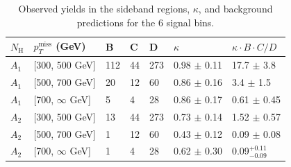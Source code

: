 \begin{table}[hbp!]
\centering
\caption{
Observed yields in the sideband regions, $\kappa$, and background predictions for the 6 signal bins.
}
\begin{tabular}{lllllll}
\hline
\hline
$N_{\mathrm{H}}$ & $p_{T}^{\mathrm{miss}}$ (GeV) & B & C & D & $\kappa$  & $\kappa \cdot B \cdot C / D$ \\
\hline
$A_{1}$ & [300, 500 GeV]      & 112 & 44  & 273 & 0.98 $\pm$ 0.11 & 17.7 $\pm$ 3.8\\
$A_{1}$ & [500, 700 GeV]      & 20   & 12  & 60   & 0.86 $\pm$ 0.16 & 3.4  $\pm$ 1.5\\
$A_{1}$ & [700, $\infty$ GeV] & 5    & 4    & 28   & 0.86 $\pm$ 0.17 & 0.61 $\pm$ 0.45\\
$A_{2}$ & [300, 500 GeV]      & 13   & 44  & 273 & 0.73 $\pm$ 0.14 & 1.52 $\pm$ 0.57\\
$A_{2}$ & [500, 700 GeV]      & 1     & 12  & 60   & 0.43 $\pm$ 0.12 & 0.09 $\pm$ 0.08\\
$A_{2}$ & [700, $\infty$ GeV] & 1     & 4     & 28   & 0.62 $\pm$ 0.30 & 0.09$^{+0.11}_{-0.09}$\\
\hline
\hline
\end{tabular}
\label{tab:tab}
\end{table}

